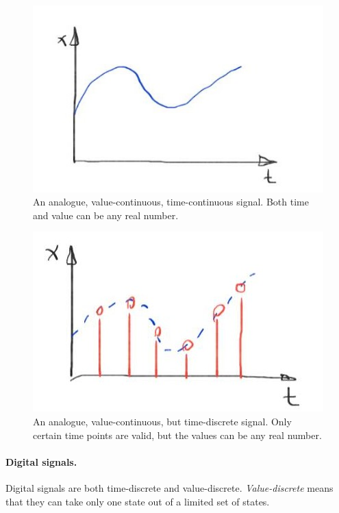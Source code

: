 \begin{refsection}
\begin{figure}[H]
	\centering
	\includegraphics{../chapter01/Signal_Analogue.jpg}
	\caption[An analogue, value-continuous, time-continuous signal]{An analogue, value-continuous, time-continuous signal. Both time and value can be any real number.}
	\label{fig:ch01:Signal_Analogue}
\end{figure}

\begin{figure}[H]
	\centering
	\includegraphics{../chapter01/Signal_TimeDiscr.jpg}
	\caption[An analogue, value-continuous, but time-discrete signal]{An analogue, value-continuous, but time-discrete signal. Only certain time points are valid, but the values can be any real number.}
	\label{fig:ch01:Signal_TimeDiscr}
\end{figure}

\paragraph{Digital signals.}

Digital signals are both time-discrete and value-discrete. \emph{Value-discrete} means that they can take only one state out of a limited set of states.


\end{refsection}
